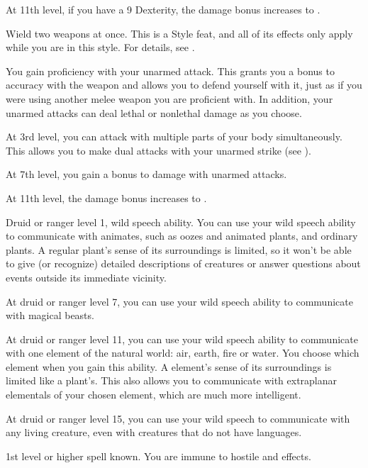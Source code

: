     At 11th level, if you have a 9 Dexterity, the damage bonus increases to .

    \stylereq Wield two weapons at once.
     This is a Style feat, and all of its effects only apply while you are in this style.
    For details, see .

    \featben You gain proficiency with your unarmed attack.
    This grants you a  bonus to accuracy with the weapon and allows you to defend yourself with it, just as if you were using another melee weapon you are proficient with.
    In addition, your unarmed attacks can deal lethal or nonlethal damage as you choose.

    At 3rd level, you can attack with multiple parts of your body simultaneously.
    This allows you to make dual attacks with your unarmed strike (see ).

    At 7th level, you gain a  bonus to damage with unarmed attacks.

    At 11th level, the damage bonus increases to .

    \featpres Druid or ranger level 1, wild speech ability.
    \featben You can use your wild speech ability to communicate with animates, such as oozes and animated plants, and ordinary plants. A regular plant's sense of its surroundings is limited, so it won't be able to give (or recognize) detailed descriptions of creatures or answer questions about events outside its immediate vicinity.

    At druid or ranger level 7, you can use your wild speech ability to communicate with magical beasts.

    At druid or ranger level 11, you can use your wild speech ability to communicate with one element of the natural world: air, earth, fire or water.
    You choose which element when you gain this ability.
    A element's sense of its surroundings is limited like a plant's.
    This also allows you to communicate with extraplanar elementals of your chosen element, which are much more intelligent.

    At druid or ranger level 15, you can use your wild speech to communicate with any living creature, even with creatures that do not have languages.

    \featpres 1st level or higher  spell known.
    \featben You are immune to hostile  and  effects.

